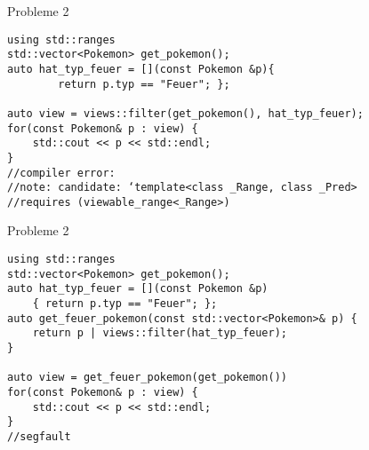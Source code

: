 \begin{frame}[fragile]{Probleme 2}
    \begin{verbatim}
using std::ranges
std::vector<Pokemon> get_pokemon();
auto hat_typ_feuer = [](const Pokemon &p){ 
        return p.typ == "Feuer"; };

auto view = views::filter(get_pokemon(), hat_typ_feuer);
for(const Pokemon& p : view) {
    std::cout << p << std::endl;
}
//compiler error:
//note: candidate: ‘template<class _Range, class _Pred>
//requires (viewable_range<_Range>)
    \end{verbatim}
\end{frame}


\begin{frame}[fragile]{Probleme 2}
    \begin{verbatim}
using std::ranges
std::vector<Pokemon> get_pokemon();
auto hat_typ_feuer = [](const Pokemon &p)
    { return p.typ == "Feuer"; };
auto get_feuer_pokemon(const std::vector<Pokemon>& p) {
    return p | views::filter(hat_typ_feuer);
}

auto view = get_feuer_pokemon(get_pokemon())
for(const Pokemon& p : view) {
    std::cout << p << std::endl;
}
//segfault
    \end{verbatim}
\end{frame}